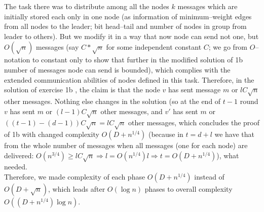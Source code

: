 \documentclass[]{article}
\begin{document}
The task there was to distribute among all the nodes $k$ messages which are initially stored each only in one node (as information of minimum--weight edges from all nodes to the leader; bit head--tail and number of nodes in group from leader to others). But we modify it in a way that now node can send not one, but $O(\sqrt{n})$ messages (say $C*\sqrt{n}$ for some independent constant $C$; we go from $O$--notation to constant only to show that further in the modified solution of 1b number of messages node can send is bounded), which complies with the extended communication abilities of nodes defined in this task. Therefore, in the solution of exercise 1b \cite{sol10}, the claim is that the node $v$ has sent message $m$ or $lC\sqrt{n}$ other messages. Nothing else changes in the solution (so at the end of $t-1$ round $v$ has sent $m$ or $(l-1)C\sqrt{n}$ other messages, and $v'$ has sent $m$ or $((t-1)-(d-1))C\sqrt{n} = lC\sqrt{n}$ other messages, which concludes the proof of 1b with changed complexity $O(D+n^{1/4})$ (because in $t=d+l$ we have that from the whole number of messages when all messages (one for each node) are delivered: $O(n^{3/4})\ge lC\sqrt{n} \Rightarrow l = O(n^{1/4})l \Rightarrow t = O(D+n^{1/4})$), what needed.\\

Therefore, we made complexity of each phase $O(D+n^{1/4})$ instead of $O(D+\sqrt{n})$, which leads after $O(\log n)$ phases to overall complexity $O\left((D+n^{1/4})\log n\right)$.



\end{document}
